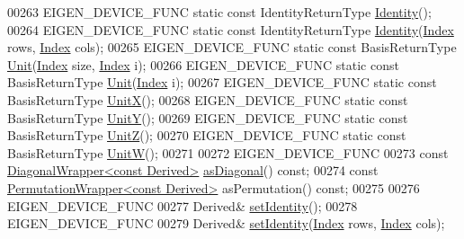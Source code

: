 \begin{DoxyCode}
00263     EIGEN\_DEVICE\_FUNC \textcolor{keyword}{static} \textcolor{keyword}{const} IdentityReturnType \hyperlink{group___core___module_a2ef43190f3aba0aef0cf1030d46d0ca7}{Identity}();
00264     EIGEN\_DEVICE\_FUNC \textcolor{keyword}{static} \textcolor{keyword}{const} IdentityReturnType \hyperlink{group___core___module_a2ef43190f3aba0aef0cf1030d46d0ca7}{Identity}(\hyperlink{namespace_eigen_a62e77e0933482dafde8fe197d9a2cfde}{Index} rows, 
      \hyperlink{namespace_eigen_a62e77e0933482dafde8fe197d9a2cfde}{Index} cols);
00265     EIGEN\_DEVICE\_FUNC \textcolor{keyword}{static} \textcolor{keyword}{const} BasisReturnType \hyperlink{group___core___module_a1f39dde25807c1f008aa874e690b3fed}{Unit}(\hyperlink{namespace_eigen_a62e77e0933482dafde8fe197d9a2cfde}{Index} size, 
      \hyperlink{namespace_eigen_a62e77e0933482dafde8fe197d9a2cfde}{Index} i);
00266     EIGEN\_DEVICE\_FUNC \textcolor{keyword}{static} \textcolor{keyword}{const} BasisReturnType \hyperlink{group___core___module_a1f39dde25807c1f008aa874e690b3fed}{Unit}(\hyperlink{namespace_eigen_a62e77e0933482dafde8fe197d9a2cfde}{Index} i);
00267     EIGEN\_DEVICE\_FUNC \textcolor{keyword}{static} \textcolor{keyword}{const} BasisReturnType \hyperlink{group___core___module_ac12aa899494685551e11f238836ee600}{UnitX}();
00268     EIGEN\_DEVICE\_FUNC \textcolor{keyword}{static} \textcolor{keyword}{const} BasisReturnType \hyperlink{group___core___module_ab8e21066a2e5cf5ca8bb0383e44a6efa}{UnitY}();
00269     EIGEN\_DEVICE\_FUNC \textcolor{keyword}{static} \textcolor{keyword}{const} BasisReturnType \hyperlink{group___core___module_a122e525a8f5ef3e4d459055615f662de}{UnitZ}();
00270     EIGEN\_DEVICE\_FUNC \textcolor{keyword}{static} \textcolor{keyword}{const} BasisReturnType \hyperlink{group___core___module_ac28c3d440440464b1fc8d9f2a6d5624a}{UnitW}();
00271 
00272     EIGEN\_DEVICE\_FUNC
00273     \textcolor{keyword}{const} \hyperlink{group___core___module_class_eigen_1_1_diagonal_wrapper}{DiagonalWrapper<const Derived>} 
      \hyperlink{group___core___module_a14235b62c90f93fe910070b4743782d0}{asDiagonal}() \textcolor{keyword}{const};
00274     \textcolor{keyword}{const} \hyperlink{group___core___module_class_eigen_1_1_permutation_wrapper}{PermutationWrapper<const Derived>} asPermutation() \textcolor{keyword}{const};
00275 
00276     EIGEN\_DEVICE\_FUNC
00277     Derived& \hyperlink{group___core___module_ae05be7fcc1ade707f0b73eb5f9d8cf33}{setIdentity}();
00278     EIGEN\_DEVICE\_FUNC
00279     Derived& \hyperlink{group___core___module_ae05be7fcc1ade707f0b73eb5f9d8cf33}{setIdentity}(\hyperlink{namespace_eigen_a62e77e0933482dafde8fe197d9a2cfde}{Index} rows, \hyperlink{namespace_eigen_a62e77e0933482dafde8fe197d9a2cfde}{Index} cols);

\end{DoxyCode}
